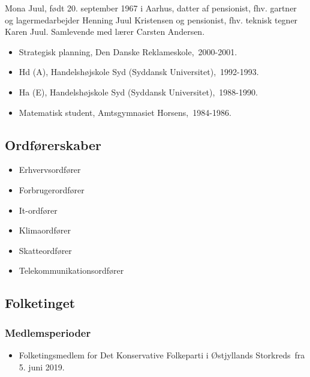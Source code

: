 \documentclass[11pt, a4paper]{awesome-cv}
\begin{document}
\makecvheader[R]
\makelettertitle
\begin{cvletter}
Mona Juul, født 20. september 1967 i Aarhus, datter af pensionist, fhv. gartner og lagermedarbejder Henning Juul Kristensen og pensionist, fhv. teknisk tegner Karen Juul. Samlevende med lærer Carsten Andersen.

\begin{itemize}
\item Strategisk planning, Den Danske Reklameskole, 2000-2001.
\item Hd (A), Handelshøjskole Syd (Syddansk Universitet), 1992-1993.
\item Ha (E), Handelshøjskole Syd (Syddansk Universitet), 1988-1990.
\item Matematisk student, Amtsgymnasiet Horsens, 1984-1986.
\end{itemize}
\subsection*{Ordførerskaber}
\begin{itemize}
\item Erhvervsordfører
\item Forbrugerordfører
\item It-ordfører
\item Klimaordfører
\item Skatteordfører
\item Telekommunikationsordfører
\end{itemize}
\subsection*{Folketinget}
\subsubsection*{Medlemsperioder}
\begin{itemize}
\item Folketingsmedlem for Det Konservative Folkeparti i Østjyllands Storkreds fra 5. juni 2019.
\end{itemize}

\end{cvletter}
\end{document}
